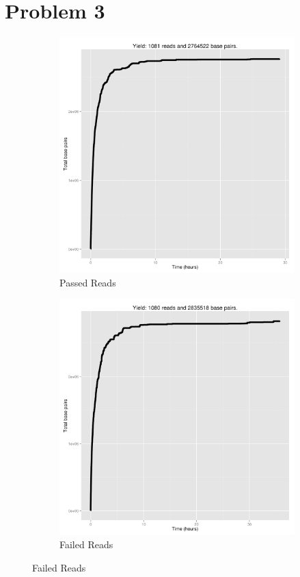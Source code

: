 \documentclass[11pt]{article}
\begin{document}
\section*{Problem 3}
\begin{figure}[h!]
  \begin{subfigure}[b]{0.45\textwidth}
    \includegraphics[width=\textwidth]{cumnucpass}
    \caption{Passed Reads}
  \end{subfigure}
  \begin{subfigure}[b]{0.45\textwidth}
    \includegraphics[width=\textwidth]{cumnucfail}
    \caption{Failed Reads}
  \end{subfigure}
\end{figure}
\end{document}
